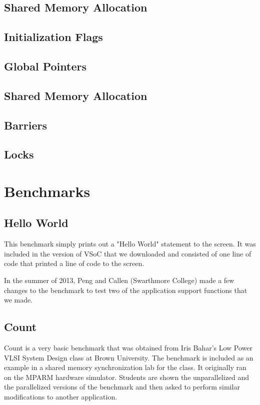 \documentclass{article}
\begin{document}
\subsection{Shared Memory Allocation}
\subsection{Initialization Flags}
\subsection{Global Pointers}
\subsection{Shared Memory Allocation}
\subsection{Barriers}
\subsection{Locks}

\newpage
\section{Benchmarks}

\subsection{Hello World}

This benchmark simply prints out a "Hello World" statement to the screen. It 
was included in the version of VSoC that we downloaded and consisted of one 
line of code that printed a line of code to the screen. 

In the summer of 2013, Peng and Callen (Swarthmore College) made a few changes 
to the benchmark to test two of the application support functions that we made. 

\subsection{Count}

Count is a very basic benchmark that was obtained from Iris Bahar's Low Power 
VLSI System Design class at Brown University. The benchmark is included as an 
example in a shared memory synchronization lab for the class. It originally 
ran on the MPARM hardware simulator. Students are shown the unparallelized and 
the parallelized versions of the benchmark and then asked to perform similar 
modifications to another application. 
\end{document}
